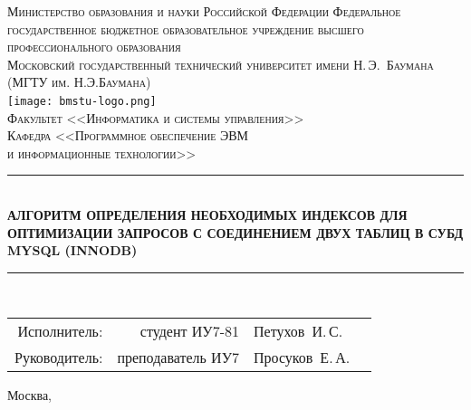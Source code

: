\newcommand{\HRule}{\rule{\linewidth}{0.5mm}}

\begin{center}

\textsc{Министерство образования и науки Российской Федерации
Федеральное государственное бюджетное образовательное учреждение 
высшего профессионального образования}\\[0.5cm]

\textsc{\large Московский государственный технический университет имени Н.\,Э.~Баумана}\\
\textsc{(МГТУ им. Н.Э.Баумана)}\\[0.5cm]
\texttt{[image: bmstu-logo.png]}~\\

\textsc{Факультет <<Информатика и системы управления>>}\\
\textsc{Кафедра <<Программное обеспечение ЭВМ\\и информационные технологии>>}\\[1cm]

\HRule \\[0.5cm]
{\huge \bfseries АЛГОРИТМ ОПРЕДЕЛЕНИЯ НЕОБХОДИМЫХ ИНДЕКСОВ ДЛЯ ОПТИМИЗАЦИИ ЗАПРОСОВ С СОЕДИНЕНИЕМ ДВУХ ТАБЛИЦ В СУБД MYSQL (INNODB)}
\HRule \\[0.5cm]

\vfill

\begin{flushright}
  \begin{tabular}{rrlc}
    Исполнитель:  &    студент ИУ7-81 & Петухов~И.\,С.  & \underline{\hspace{3cm}} \\[1cm]
    Руководитель: & преподаватель ИУ7 & Просуков~Е.\,А. & \underline{\hspace{3cm}} \\[1cm]
  \end{tabular}
\end{flushright}

{\large Москва, \the\year}

\end{center}

\newpage
{}